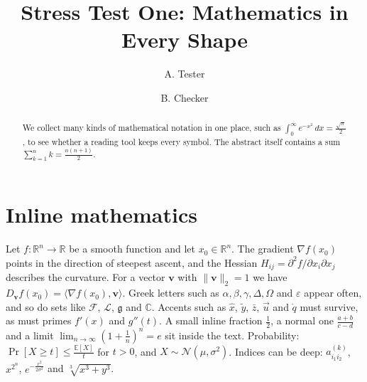 \documentclass[11pt]{article}
\title{Stress Test One: Mathematics in Every Shape}
\author{A. Tester \and B. Checker}
\date{}
\begin{document}
\maketitle
\begin{abstract}
We collect many kinds of mathematical notation in one place, such as $\int_0^\infty e^{-x^2}\,dx=\frac{\sqrt{\pi}}{2}$,
to see whether a reading tool keeps every symbol. The abstract itself contains a sum $\sum_{k=1}^{n} k = \frac{n(n+1)}{2}$.
\end{abstract}

\section{Inline mathematics}
Let $f\colon \mathbb{R}^n \to \mathbb{R}$ be a smooth function and let $x_0 \in \mathbb{R}^n$. The gradient
$\nabla f(x_0)$ points in the direction of steepest ascent, and the Hessian $H_{ij} = \partial^2 f / \partial x_i \partial x_j$
describes the curvature. For a vector $\mathbf{v}$ with $\|\mathbf{v}\|_2 = 1$ we have
$D_{\mathbf{v}} f(x_0) = \langle \nabla f(x_0), \mathbf{v} \rangle$. Greek letters such as $\alpha, \beta, \gamma, \Delta, \Omega$
and $\varepsilon$ appear often, and so do sets like $\mathcal{F}$, $\mathscr{L}$, $\mathfrak{g}$ and $\mathbb{C}$.
Accents such as $\hat{x}$, $\tilde{y}$, $\bar{z}$, $\vec{u}$ and $\dot{q}$ must survive, as must primes $f'(x)$ and $g''(t)$.
A small inline fraction $\tfrac{1}{2}$, a normal one $\frac{a+b}{c-d}$ and a limit $\lim_{n\to\infty} (1+\frac{1}{n})^n = e$
sit inside the text. Probability: $\Pr[X \geq t] \leq \frac{\mathbb{E}[X]}{t}$ for $t>0$, and $X \sim \mathcal{N}(\mu,\sigma^2)$.
Indices can be deep: $a_{i_1 i_2}^{(k)}$, $x^{2^n}$, $e^{-\frac{x^2}{2\sigma^2}}$ and $\sqrt[3]{x^3+y^3}$.
\end{document}
